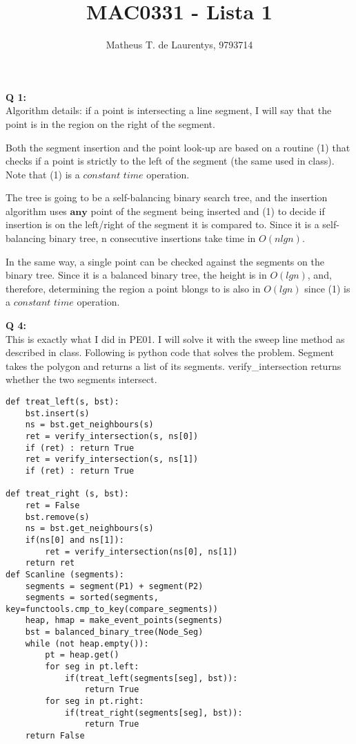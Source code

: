\documentclass[]{article}
\title{\vspace{-4.0cm}MAC0331 - Lista 1}
\author{Matheus T. de Laurentys, 9793714}
\begin{document}
	\maketitle
	\noindent
	\textbf{Q 1:} \\
	Algorithm details: if a point is intersecting a line segment, I will say that the point is in the region on the right of the segment.
	
	Both the segment insertion and the point look-up are based on a routine (1) that checks if a point is strictly to the left of the segment (the same used in class). Note that (1) is a $\textit{constant time}$ operation.
	
	The tree is going to be a self-balancing binary search tree, and the insertion algorithm uses $\textbf{any}$ point of the segment being inserted and (1) to decide if insertion is on the left/right of the segment it is compared to. Since it is a self-balancing binary tree, n consecutive insertions take time in $O(nlgn)$.
	
	In the same way, a single point can be checked against the segments on the binary tree. Since it is a balanced binary tree, the height is in $O(lgn)$, and, therefore, determining the region a point blongs to is also in $O(lgn)$ since (1) is a $\textit{constant time}$ operation.
	
	\textbf{Q 4:} \\
	This is exactly what I did in PE01. I will solve it with the sweep line method as described in class. Following is python code that solves the problem. Segment takes the polygon and returns a list of its segments. verify\_intersection returns whether the two segments intersect.
	
		\begin{lstlisting}
def treat_left(s, bst):
	bst.insert(s)
	ns = bst.get_neighbours(s)
	ret = verify_intersection(s, ns[0])
	if (ret) : return True
	ret = verify_intersection(s, ns[1])
	if (ret) : return True
	
def treat_right (s, bst):
	ret = False
	bst.remove(s)
	ns = bst.get_neighbours(s)
	if(ns[0] and ns[1]):
		ret = verify_intersection(ns[0], ns[1])
	return ret
def Scanline (segments):
	segments = segment(P1) + segment(P2)
	segments = sorted(segments, key=functools.cmp_to_key(compare_segments))
	heap, hmap = make_event_points(segments)
	bst = balanced_binary_tree(Node_Seg)
	while (not heap.empty()):
		pt = heap.get()
		for seg in pt.left:
			if(treat_left(segments[seg], bst)):
				return True
		for seg in pt.right:
			if(treat_right(segments[seg], bst)):
				return True
	return False
	\end{lstlisting}
	
\end{document}
